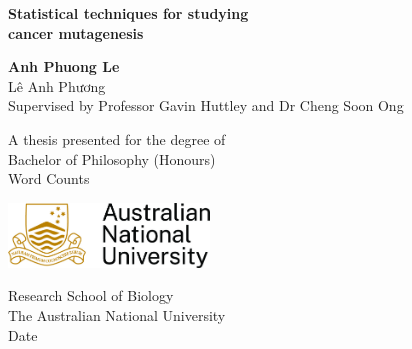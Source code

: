 \begin{titlepage}
    \begin{center}
        \vspace*{1cm}
        \Huge
        \textbf{Statistical techniques for studying \\ cancer mutagenesis} \\

        \LARGE
        \vspace{3cm}
            
        \textbf{Anh Phuong Le} \\
        \normalsize
        \foreignlanguage{vietnamese}{Lê Anh Phương} \\
        \vspace{1cm}
        Supervised by Professor Gavin Huttley and Dr Cheng Soon Ong
            
        \vfill
        
        \normalsize    
        A thesis presented for the degree of\\
        Bachelor of Philosophy (Honours) \\
        Word Counts
            
        \vspace{0.8cm}
            
        \includegraphics[width=0.4\textwidth]{graphics/ANU_Primary_Horizontal_GoldBlack.jpg}
            
        \Large
        Research School of Biology\\
        The Australian National University\\
        Date
            
    \end{center}
\end{titlepage}